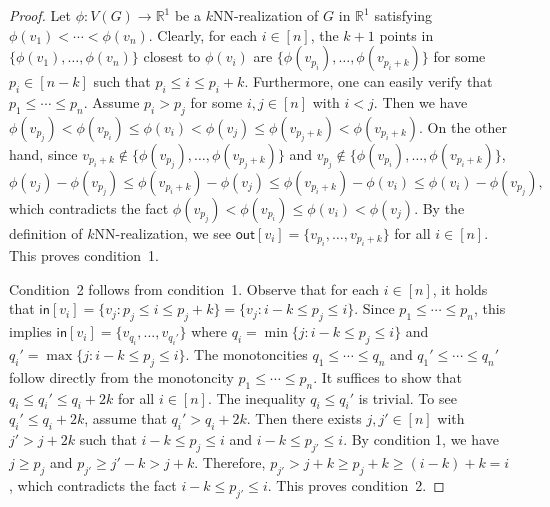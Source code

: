 \documentclass[english]{lipics-v2021}
\begin{document}
\begin{proof}
Let $\phi:V(G) \rightarrow \mathbb{R}^1$ be a $k$NN-realization of $G$ in $\mathbb{R}^1$ satisfying $\phi(v_1) < \cdots < \phi(v_n)$.
Clearly, for each $i \in [n]$, the $k+1$ points in $\{\phi(v_1),\dots,\phi(v_n)\}$ closest to $\phi(v_i)$ are $\{\phi(v_{p_i}),\dots,\phi(v_{p_i+k})\}$ for some $p_i \in [n-k]$ such that $p_i \leq i \leq p_i+k$.
Furthermore, one can easily verify that $p_1 \leq \cdots \leq p_n$.
Assume $p_i > p_j$ for some $i,j \in [n]$ with $i<j$.
Then we have $\phi(v_{p_j}) < \phi(v_{p_i}) \leq \phi(v_i) < \phi(v_j) \leq \phi(v_{p_j+k}) < \phi(v_{p_i+k})$.
On the other hand, since $v_{p_i+k} \notin \{\phi(v_{p_j}),\dots,\phi(v_{p_j+k})\}$ and $v_{p_j} \notin \{\phi(v_{p_i}),\dots,\phi(v_{p_i+k})\}$,
\begin{equation*}
    \phi(v_j) - \phi(v_{p_j}) \leq \phi(v_{p_i+k}) - \phi(v_j) \leq \phi(v_{p_i+k}) - \phi(v_i) \leq \phi(v_i) - \phi(v_{p_j}),
\end{equation*}
which contradicts the fact $\phi(v_{p_j}) < \phi(v_{p_i}) \leq \phi(v_i) < \phi(v_j)$.
By the definition of $k$NN-realization, we see $\mathsf{out}[v_i] = \{v_{p_i},\dots,v_{p_i+k}\}$ for all $i \in [n]$.
This proves condition~1.

Condition~2 follows from condition~1.
Observe that for each $i \in [n]$, it holds that $\mathsf{in}[v_i] = \{v_j: p_j \leq i \leq p_j+k \} = \{v_j: i-k \leq p_j \leq i\}$.
Since $p_1 \leq \cdots \leq p_n$, this implies $\mathsf{in}[v_i] = \{v_{q_i},\dots,v_{q_i'}\}$ where $q_i = \min\{j: i-k \leq p_j \leq i\}$ and $q_i' = \max\{j: i-k \leq p_j \leq i\}$.
The monotoncities $q_1 \leq \cdots \leq q_n$ and $q_1' \leq \cdots \leq q_n'$ follow directly from the monotoncity $p_1 \leq \cdots \leq p_n$.
It suffices to show that $q_i \leq q_i' \leq q_i+2k$ for all $i \in [n]$.
The inequality $q_i \leq q_i'$ is trivial.
To see $q_i' \leq q_i+2k$, assume that $q_i' > q_i+2k$.
Then there exists $j,j' \in [n]$ with $j' > j+2k$ such that $i-k \leq p_j \leq i$ and $i-k \leq p_{j'} \leq i$.
By condition 1, we have $j \geq p_j$ and $p_{j'} \geq j' - k > j+k$.
Therefore, $p_{j'} > j+k \geq p_j+k \geq (i-k)+k = i$, which contradicts the fact $i-k \leq p_{j'} \leq i$.
This proves condition~2.
\end{proof}
\end{document}
